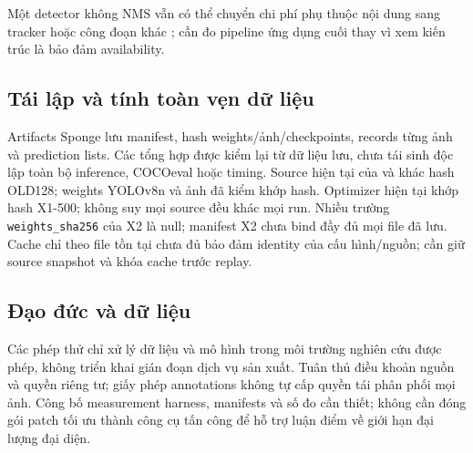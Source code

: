\documentclass[a4paper,fleqn]{cas-dc}
\newif\ifbranchB
\begin{document}
\ifbranchB
Latency GPU hiện gồm một phiên trên mỗi seed, thứ tự cố định; raw per-frame không được giữ để tái tính tail. RTX 5060 không đại diện thiết bị edge.
\fi Một detector không NMS vẫn có thể chuyển chi phí phụ thuộc nội dung sang tracker hoặc công đoạn khác \cite{trackflood2026}; cần đo pipeline ứng dụng cuối thay vì xem kiến trúc là bảo đảm availability.

\subsection{Tái lập và tính toàn vẹn dữ liệu}

Artifacts Sponge lưu manifest, hash weights/ảnh/checkpoints, records từng ảnh và prediction lists. Các tổng hợp được kiểm lại từ dữ liệu lưu, chưa tái sinh độc lập toàn bộ inference, COCOeval hoặc timing. Source hiện tại của  và  khác hash OLD128; weights YOLOv8n và ảnh đã kiểm khớp hash. Optimizer hiện tại khớp hash X1-500; không suy mọi source đều khác mọi run. Nhiều trường \texttt{weights\_sha256} của X2 là null; manifest X2 chưa bind đầy đủ mọi file đã lưu. Cache chỉ theo file tồn tại chưa đủ bảo đảm identity của cấu hình/nguồn; cần giữ source snapshot và khóa cache trước replay.
\ifbranchB
Nhánh A lưu manifest, ảnh/checkpoint hashes, record từng ảnh và prediction lists. Nhánh B lưu 20 lịch sử epoch có hash, record mốc và latency summaries. Đối chiếu đã tái tính selection và tổng hợp từ các tạo tác đó; không có lượt tái huấn luyện hoặc tái sinh AP fullscale độc lập. Các checkpoint, dataset fullscale và snapshot YOLOv13 trên máy thực nghiệm chưa nằm đầy đủ trong gói hiện có.

Cache hoàn tất cần khóa config/nguồn trước khi reuse; setup phải pin implementation đúng bản đã đo; generator cần hỗ trợ archived CSV khi thiếu runs gốc. Checkpoint fine-tuned cần hash và raw predictions/timing để bind kết quả. Các yêu cầu này mô tả công việc tái lập còn lại, không cáo buộc dữ liệu hiện tại sai. Khác checksum source YOLOv12 trên Windows do CRLF đã được đối chiếu với bản chuẩn hóa LF; không che mismatch byte-exact bằng một kết luận toàn nghiên cứu đạt.
\fi

\subsection{Đạo đức và dữ liệu}

Các phép thử chỉ xử lý dữ liệu và mô hình trong môi trường nghiên cứu được phép, không triển khai gián đoạn dịch vụ sản xuất. Tuân thủ điều khoản nguồn và quyền riêng tư; giấy phép annotations không tự cấp quyền tái phân phối mọi ảnh. Công bố measurement harness, manifests và số đo cần thiết; không cần đóng gói patch tối ưu thành công cụ tấn công để hỗ trợ luận điểm về giới hạn đại lượng đại diện.
\end{document}
